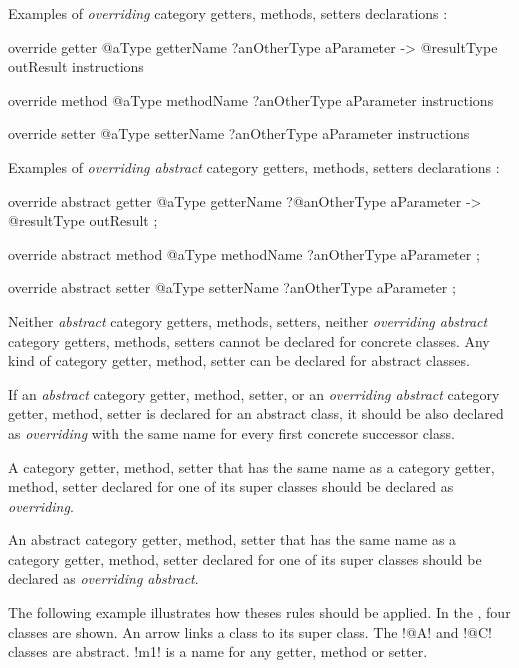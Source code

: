 Examples of \emph{overriding} category getters, methods, setters declarations :
\begin{galgascode}
override getter @aType getterName
  ?anOtherType aParameter
  -> @resultType outResult
{
  instructions
}

override method @aType methodName
  ?anOtherType aParameter
{
  instructions
}

override setter @aType setterName
  ?anOtherType aParameter
{
  instructions
}
\end{galgascode}


Examples of \emph{overriding abstract} category getters, methods, setters declarations :
\begin{galgascode}
override abstract getter @aType getterName
  ?@anOtherType aParameter
  -> @resultType outResult
;

override abstract method @aType methodName
  ?anOtherType aParameter
;

override abstract setter @aType setterName
  ?anOtherType aParameter
;
\end{galgascode}



Neither \emph{abstract} category getters, methods, setters, neither \emph{overriding abstract} category getters, methods, setters cannot be declared for concrete classes. Any kind of category getter, method, setter can be declared for abstract classes.

If an \emph{abstract} category getter, method, setter, or an \emph{overriding abstract} category getter, method, setter is declared for an abstract class, it should be also declared as \emph{overriding} with the same name for every first concrete successor class.

A category getter, method, setter that has the same name as a category getter, method, setter declared for one of its super classes should be declared as \emph{overriding}.

An abstract category getter, method, setter that has the same name as a category getter, method, setter declared for one of its super classes should be declared as \emph{overriding abstract}.

The following example illustrates how theses rules should be applied. In the , four classes are shown. An arrow links a class to its super class. The \ggs!@A! and \ggs!@C! classes are abstract. \ggs!m1! is a name for any getter, method or setter.

